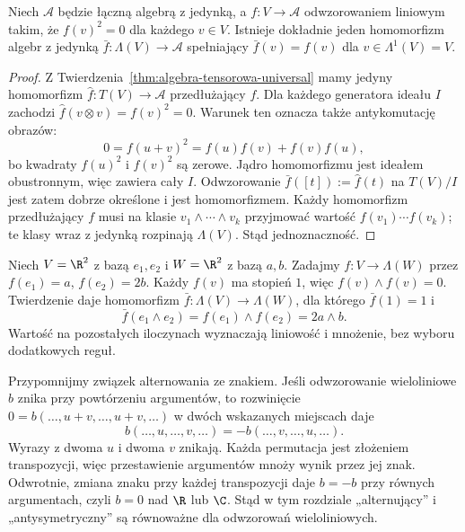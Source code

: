 \begin{twierdzenie}
\label{thm:wedge-algebra-universal}
Niech $\mathcal A$ będzie łączną algebrą z jedynką,
a $f\colon V\to\mathcal A$ odwzorowaniem liniowym takim, że
$f(v)^2=0$ dla każdego $v\in V$. Istnieje dokładnie jeden
homomorfizm algebr z jedynką
$\bar f\colon\Lambda(V)\to\mathcal A$ spełniający
$\bar f(v)=f(v)$ dla $v\in\Lambda^1(V)=V$.
\end{twierdzenie}
\begin{proof}
Z Twierdzenia~\ref{thm:algebra-tensorowa-universal} mamy
jedyny homomorfizm $\widehat f\colon T(V)\to\mathcal A$
przedłużający $f$. Dla każdego generatora ideału $I$
zachodzi $\widehat f(v\otimes v)=f(v)^2=0$.
Warunek ten oznacza także antykomutację obrazów:
\[
 0=f(u+v)^2=f(u)f(v)+f(v)f(u),
\]
bo kwadraty $f(u)^2$ i $f(v)^2$ są zerowe.
Jądro homomorfizmu jest ideałem obustronnym, więc zawiera
cały $I$. Odwzorowanie
$\bar f([t]):=\widehat f(t)$ na $T(V)/I$ jest zatem
dobrze określone i jest homomorfizmem. Każdy homomorfizm
przedłużający $f$ musi na klasie
$v_1\wedge\cdots\wedge v_k$ przyjmować wartość
$f(v_1)\cdots f(v_k)$; te klasy wraz z jedynką rozpinają
$\Lambda(V)$. Stąd jednoznaczność.
\end{proof}

\begin{przyklad}
Niech $V=\R^2$ z bazą $e_1,e_2$ i $W=\R^2$ z bazą
$a,b$. Zadajmy $f\colon V\to\Lambda(W)$ przez
$f(e_1)=a$, $f(e_2)=2b$. Każdy $f(v)$ ma stopień $1$,
więc $f(v)\wedge f(v)=0$. Twierdzenie daje homomorfizm
$\bar f\colon\Lambda(V)\to\Lambda(W)$, dla którego
$\bar f(1)=1$ i
\[
 \bar f(e_1\wedge e_2)=f(e_1)\wedge f(e_2)=2a\wedge b.
\]
Wartość na pozostałych iloczynach wyznaczają liniowość
i mnożenie, bez wyboru dodatkowych reguł.
\end{przyklad}

Przypomnijmy związek alternowania ze znakiem. Jeśli odwzorowanie
wieloliniowe $b$ znika przy powtórzeniu argumentów, to rozwinięcie
$0=b(\ldots,u+v,\ldots,u+v,\ldots)$ w dwóch wskazanych miejscach
daje
\[
 b(\ldots,u,\ldots,v,\ldots)
 =-b(\ldots,v,\ldots,u,\ldots).
\]
Wyrazy z dwoma $u$ i dwoma $v$ znikają. Każda permutacja jest
złożeniem transpozycji, więc przestawienie argumentów mnoży wynik
przez jej znak. Odwrotnie, zmiana znaku przy każdej transpozycji
daje $b=-b$ przy równych argumentach, czyli $b=0$ nad $\R$ lub $\C$.
Stąd w tym rozdziale „alternujący” i „antysymetryczny” są równoważne
dla odwzorowań wieloliniowych.

